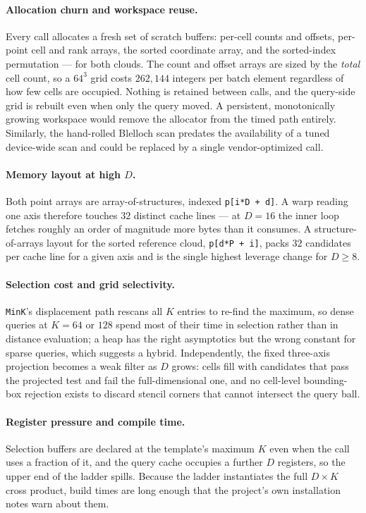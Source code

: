 \documentclass[11pt]{article}
\begin{document}
\paragraph{Allocation churn and workspace reuse.}
Every call allocates a fresh set of scratch buffers: per-cell counts and
offsets, per-point cell and rank arrays, the sorted coordinate array, and the
sorted-index permutation --- for both clouds. The count and offset arrays are
sized by the \emph{total} cell count, so a $64^3$ grid costs $262{,}144$
integers per batch element regardless of how few cells are occupied. Nothing is
retained between calls, and the query-side grid is rebuilt even when only the
query moved. A persistent, monotonically growing workspace would remove the
allocator from the timed path entirely. Similarly, the hand-rolled Blelloch scan
predates the availability of a tuned device-wide scan and could be replaced by a
single vendor-optimized call.

\paragraph{Memory layout at high $D$.}
Both point arrays are array-of-structures, indexed \texttt{p[i*D + d]}. A warp
reading one axis therefore touches $32$ distinct cache lines --- at $D=16$ the
inner loop fetches roughly an order of magnitude more bytes than it consumes.
A structure-of-arrays layout for the sorted reference cloud, \texttt{p[d*P + i]},
packs $32$ candidates per cache line for a given axis and is the single highest
leverage change for $D \ge 8$.

\paragraph{Selection cost and grid selectivity.}
\texttt{MinK}'s displacement path rescans all $K$ entries to re-find the
maximum, so dense queries at $K = 64$ or $128$ spend most of their time in
selection rather than in distance evaluation; a heap has the right asymptotics
but the wrong constant for sparse queries, which suggests a hybrid. Independently,
the fixed three-axis projection becomes a weak filter as $D$ grows: cells fill
with candidates that pass the projected test and fail the full-dimensional one,
and no cell-level bounding-box rejection exists to discard stencil corners that
cannot intersect the query ball.

\paragraph{Register pressure and compile time.}
Selection buffers are declared at the template's maximum $K$ even when the call
uses a fraction of it, and the query cache occupies a further $D$ registers, so
the upper end of the ladder spills. Because the ladder instantiates the full
$D \times K$ cross product, build times are long enough that the project's own
installation notes warn about them.
\end{document}
